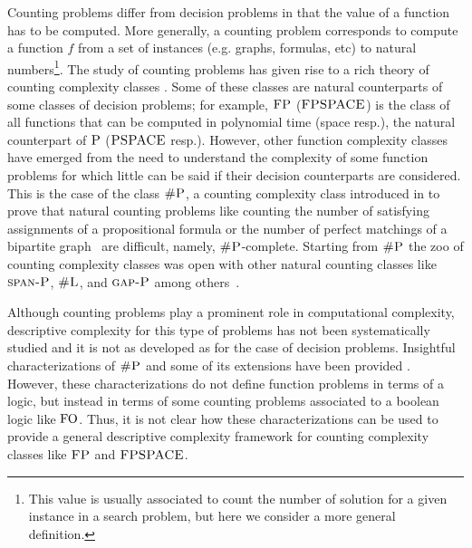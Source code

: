 Counting problems differ from decision problems in that the value of a function has to be computed.
More generally, a counting problem corresponds to compute a function $f$ from a set of instances (e.g. graphs, formulas, etc) to natural numbers\footnote{This value is usually associated to count the number of solution for a given instance in a search problem, but here we consider a more general definition.}. 
The study of counting problems has given rise to a rich theory of counting complexity classes \cite{HV95,F97,arora2009computational}. Some of these classes are natural counterparts of some classes of decision problems; for example, $\text{\sc FP}$ ($\text{\sc FPSPACE}$) is the class of all functions that can be computed in polynomial time (space resp.), the natural counterpart of $\text{\sc P}$ ($\text{\sc PSPACE}$ resp.). 
However, other function complexity classes have emerged from the need to understand the complexity of some function problems for which little can be said if their decision counterparts are considered. This is the case of the class $\text{\sc \#P}$, a counting complexity class introduced in \cite{Valiant79} to prove that natural counting problems like counting the number of satisfying assignments of a propositional formula or the number of perfect matchings of a bipartite graph~\cite{Valiant79} are difficult, namely, $\text{\sc \#P}$-complete.
Starting from $\text{\sc \#P}$ the zoo of counting complexity classes was open with other natural counting classes like $\text{\sc span-P}$, $\text{\sc \#L}$, and $\text{\sc gap-P}$ among others~\cite{HV95,F97}.

Although counting problems play a prominent role in computational complexity, descriptive complexity for this type of problems has not been systematically studied and it is not as developed as for the case of decision problems. Insightful characterizations of $\text{\sc \#P}$ and some of its extensions have been provided \cite{SalujaST95,ComptonG96}. However, these characterizations do not define function problems in terms of a logic, but instead in terms of some counting problems associated to a boolean logic like ${\rm FO}$. Thus, it is not clear how these characterizations can be used to provide a general descriptive complexity framework for counting complexity classes like $\text{\sc FP}$ and $\text{\sc FPSPACE}$.

